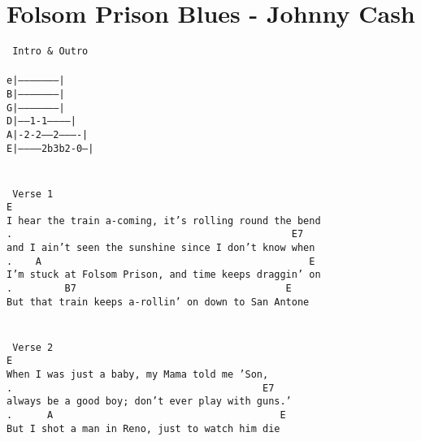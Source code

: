 \newpage
\section{Folsom Prison Blues - Johnny Cash}
\label{Folsom Prison Blues - Johnny Cash}
\texttt{\lbrack\ Intro\ \&\ Outro\rbrack\\
\\
e|--------------------|\\
B|--------------------|\\
G|--------------------|\\
D|-----1-1------------|\\
A|-2-2-----2----------|\ \\
E|-----------2b3b2-0--|\\
\\
\\
\lbrack\ Verse\ 1\rbrack\\
E\ \ \ \ \ \ \ \ \ \ \ \ \ \\
I\ hear\ the\ train\ a-coming,\ it's\ rolling\ round\ the\ bend\\
.\ \ \ \ \ \ \ \ \ \ \ \ \ \ \ \ \ \ \ \ \ \ \ \ \ \ \ \ \ \ \ \ \ \ \ \ \ \ \ \ \ \ \ \ \ \ \ \ E7\ \ \\
and\ I\ ain't\ seen\ the\ sunshine\ since\ I\ don't\ know\ when\\
.\ \ \ \ A\ \ \ \ \ \ \ \ \ \ \ \ \ \ \ \ \ \ \ \ \ \ \ \ \ \ \ \ \ \ \ \ \ \ \ \ \ \ \ \ \ \ \ \ \ \ E\ \ \ \ \\
I'm\ stuck\ at\ Folsom\ Prison,\ and\ time\ keeps\ draggin'\ on\\
.\ \ \ \ \ \ \ \ \ B7\ \ \ \ \ \ \ \ \ \ \ \ \ \ \ \ \ \ \ \ \ \ \ \ \ \ \ \ \ \ \ \ \ \ \ \ E\\
But\ that\ train\ keeps\ a-rollin'\ on\ down\ to\ San\ Antone\\
\\
\\
\lbrack\ Verse\ 2\rbrack\\
E\\
When\ I\ was\ just\ a\ baby,\ my\ Mama\ told\ me\ 'Son,\\
.\ \ \ \ \ \ \ \ \ \ \ \ \ \ \ \ \ \ \ \ \ \ \ \ \ \ \ \ \ \ \ \ \ \ \ \ \ \ \ \ \ \ \ E7\\
always\ be\ a\ good\ boy;\ don't\ ever\ play\ with\ guns.'\\
.\ \ \ \ \ \ A\ \ \ \ \ \ \ \ \ \ \ \ \ \ \ \ \ \ \ \ \ \ \ \ \ \ \ \ \ \ \ \ \ \ \ \ \ \ \ E\\
But\ I\ shot\ a\ man\ in\ Reno,\ just\ to\ watch\ him\ die\\
}
